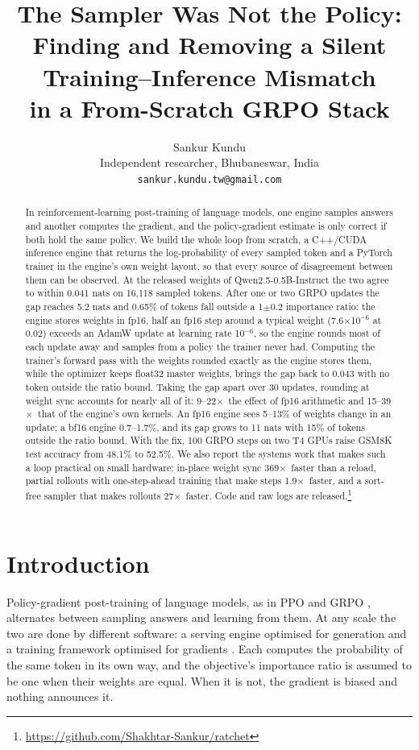 \documentclass[11pt]{article}
\title{The Sampler Was Not the Policy:\\Finding and Removing a Silent Training--Inference Mismatch\\in a From-Scratch GRPO Stack}
\author{Sankur Kundu \\
  Independent researcher, Bhubaneswar, India \\
  \texttt{sankur.kundu.tw@gmail.com}}
\newcommand{\x}{$\times$}
\begin{document}
\maketitle

\begin{abstract}
In reinforcement-learning post-training of language models, one engine samples answers and
another computes the gradient, and the policy-gradient estimate is only correct if both hold the
same policy. We build the whole loop from scratch, a C++/CUDA inference engine that returns the
log-probability of every sampled token and a PyTorch trainer in the engine's own weight layout,
so that every source of disagreement between them can be observed. At the released weights of
Qwen2.5-0.5B-Instruct the two agree to within 0.041 nats on 16,118 sampled tokens. After one or
two GRPO updates the gap reaches 5.2 nats and 0.65\% of tokens fall outside a 1$\pm$0.2
importance ratio: the engine stores weights in fp16, half an fp16 step around a typical weight
(7.6$\times$10$^{-6}$ at 0.02) exceeds an AdamW update at learning rate 10$^{-6}$, so the engine
rounds most of each update away and samples from a policy the trainer never had. Computing the
trainer's forward pass with the weights rounded exactly as the engine stores them, while the
optimizer keeps float32 master weights, brings the gap back to 0.043 with no token outside the
ratio bound. Taking the gap apart over 30 updates, rounding at weight sync accounts for nearly all
of it: 9--22\x\ the effect of fp16 arithmetic and 15--39\x\ that of the engine's own kernels. An
fp16 engine sees 5--13\% of weights change in an update; a bf16 engine 0.7--1.7\%, and its gap
grows to 11 nats with 15\% of tokens outside the ratio bound. With the fix, 100 GRPO steps on two
T4 GPUs raise GSM8K test accuracy from 48.1\% to 52.5\%. We also report the systems work that makes such a loop practical on small hardware:
in-place weight sync 369\x\ faster than a reload, partial rollouts with one-step-ahead training
that make steps 1.9\x\ faster, and a sort-free sampler that makes rollouts 27\x\ faster. Code and
raw logs are released.\footnote{\url{https://github.com/Shakhtar-Sankur/ratchet}}
\end{abstract}

\section{Introduction}

Policy-gradient post-training of language models, as in PPO \citep{schulman2017ppo} and GRPO
\citep{shao2024deepseekmath}, alternates between sampling answers and learning from them. At any
scale the two are done by different software: a serving engine optimised for generation
\citep{kwon2023vllm} and a training framework optimised for gradients
\citep{sheng2024hybridflow,hu2024openrlhf}. Each computes the probability of the same token in
its own way, and the objective's importance ratio is assumed to be one when their weights are
equal. When it is not, the gradient is biased and nothing announces it.
\end{document}
